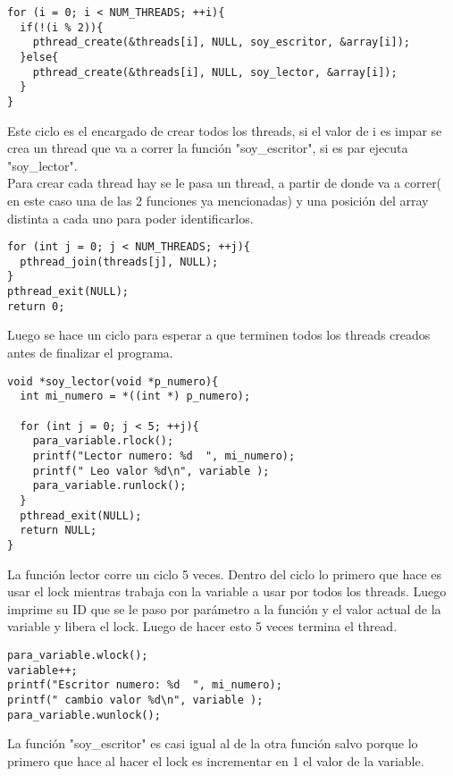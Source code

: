\begin{verbatim}
for (i = 0; i < NUM_THREADS; ++i){
  if(!(i % 2)){
    pthread_create(&threads[i], NULL, soy_escritor, &array[i]);
  }else{
    pthread_create(&threads[i], NULL, soy_lector, &array[i]);
  }
}
\end{verbatim}

Este ciclo es el encargado de crear todos los threads, si el valor de i es impar se crea un thread que va a correr la funci\'{o}n 
"soy\_escritor", si es par ejecuta "soy\_lector". \\
Para crear cada thread hay se le pasa un thread, a partir de donde va a correr( en este caso una de las 2 funciones ya mencionadas) 
y una posici\'{o}n del array distinta a cada uno para poder identificarlos.\\

\begin{verbatim}
for (int j = 0; j < NUM_THREADS; ++j){
  pthread_join(threads[j], NULL);
}
pthread_exit(NULL);
return 0;
\end{verbatim}
Luego se hace un ciclo para esperar a que terminen todos los threads creados antes de finalizar el programa.\\

\begin{verbatim}
void *soy_lector(void *p_numero){
  int mi_numero = *((int *) p_numero);

  for (int j = 0; j < 5; ++j){
    para_variable.rlock();
    printf("Lector numero: %d  ", mi_numero);
    printf(" Leo valor %d\n", variable );
    para_variable.runlock();
  }
  pthread_exit(NULL);
  return NULL;
}
\end{verbatim}

La funci\'{o}n lector corre un ciclo 5 veces. Dentro del ciclo lo primero que hace es usar el lock mientras trabaja con la 
variable a usar por todos los threads. Luego imprime su ID que se le paso por par\'{a}metro a la funci\'{o}n y el valor 
actual de la variable y libera el lock. Luego de hacer esto 5 veces termina el thread.\\


\begin{verbatim}
para_variable.wlock();
variable++;
printf("Escritor numero: %d  ", mi_numero);
printf(" cambio valor %d\n", variable );
para_variable.wunlock();
\end{verbatim}

La funci\'{o}n "soy\_escritor" es casi igual al de la otra funci\'{o}n salvo porque lo primero que hace al hacer el lock es 
incrementar en 1 el valor de la variable. \\

